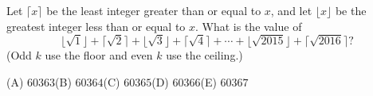 Let $\lceil x\rceil$ be the least integer greater than or equal to $x$, and let $\lfloor x\rfloor$ be the greatest integer less than or equal to $x$. What is the value of
\[
\lfloor\sqrt1\rfloor+\lceil\sqrt2\rceil+\lfloor\sqrt3\rfloor+\lceil\sqrt4\rceil+\cdots+\lfloor\sqrt{2015}\rfloor+\lceil\sqrt{2016}\rceil ?
\]
(Odd $k$ use the floor and even $k$ use the ceiling.)

(A) $60363$\qquad (B) $60364$\qquad (C) $60365$\qquad (D) $60366$\qquad (E) $60367$
